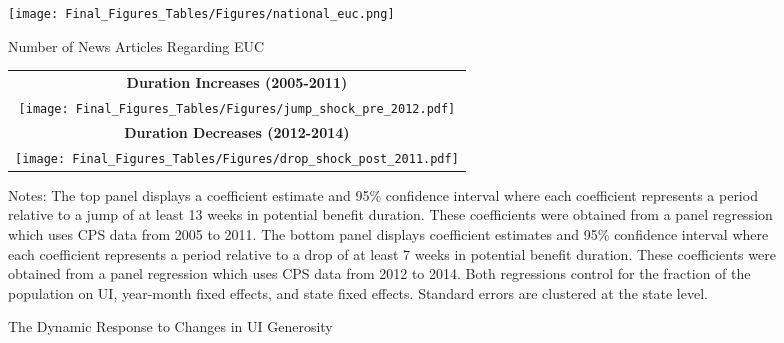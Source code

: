 \documentclass[12pt]{article}
\begin{document}
\begin{spacing}{2}
\newpage
\clearpage

\begin{figure}
  \begin{center}
    \texttt{[image: Final\_Figures\_Tables/Figures/national\_euc.png]}
  \caption{Number of News Articles Regarding EUC}
  \label{fig:euc_news}
  \end{center}
\end{figure}


\newpage
\clearpage


\begin{figure}[!ht]
\centering
\caption{The Dynamic Response to Changes in UI Generosity} \label{fig:impulse_change}
	\begin{tabular}{c}
	\textbf{Duration Increases (2005-2011)}\\
\texttt{[image: Final\_Figures\_Tables/Figures/jump\_shock\_pre\_2012.pdf]}\\
	\textbf{Duration Decreases (2012-2014)}\\
\texttt{[image: Final\_Figures\_Tables/Figures/drop\_shock\_post\_2011.pdf]}
\end{tabular}
	\vspace{.5mm}
	\hspace{.45in}
	\begin{tablenotes}
\item Notes: The top panel displays a coefficient estimate and 95\% confidence interval where each coefficient represents a period relative to a jump of at least 13 weeks in potential benefit duration. These coefficients were obtained from a panel regression which uses CPS data from 2005 to 2011. The bottom panel displays coefficient estimates and 95\% confidence interval where each coefficient represents a period relative to a drop of at least 7 weeks in potential benefit duration. These coefficients were obtained from a panel regression which uses CPS data from 2012 to 2014. Both regressions control for the fraction of the population on UI, year-month fixed effects, and state fixed effects. Standard errors are clustered at the state level.
\end{tablenotes}
\end{figure}




\end{spacing}
\end{document}
